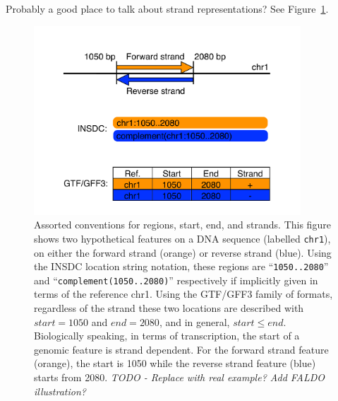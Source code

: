 Probably a good place to talk about strand representations?
See Figure~\ref{fig:strands}.

\begin{figure}[p]
\begin{center}
\includegraphics[width=10cm]{figures/figure-strand.pdf}
\end{center}
\caption{Assorted conventions for regions, start, end, and strands.
This figure shows two hypothetical features on a DNA sequence
(labelled \texttt{chr1}), on either the forward strand (orange) or
reverse strand (blue).
Using the INSDC location string notation, these regions are
``\texttt{1050..2080}'' and ``\texttt{complement(1050..2080)}''
respectively if implicitly given in terms of the reference chr1.
Using the GTF/GFF3 family of formats, regardless of the
strand these two locations are described with $start = 1050$
and $end = 2080$, and in general, $start \leq end$.
Biologically speaking, in terms of transcription, the start of a genomic
feature is strand dependent.
For the forward strand feature (orange), the start is 1050
while the reverse strand feature (blue) starts from 2080.
\textit{TODO - Replace with real example? Add FALDO illustration?}
}
\label{fig:strands}
\end{figure}
